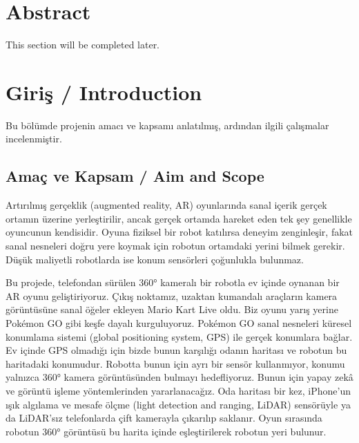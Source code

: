 \documentclass[11pt,a4paper]{article}
\begin{document}
\vspace{1cm}

\section*{Abstract}
This section will be completed later.

\newpage
\tableofcontents
\newpage
\listoffigures
\listoftables
\newpage

\setcounter{page}{1}

\section{Giriş / Introduction}
\label{sec:giris}
Bu bölümde projenin amacı ve kapsamı anlatılmış, ardından ilgili çalışmalar incelenmiştir.

\subsection{Amaç ve Kapsam / Aim and Scope}
\label{subsec:amac_kapsam}
Artırılmış gerçeklik (augmented reality, AR) oyunlarında sanal içerik gerçek ortamın üzerine yerleştirilir, ancak gerçek ortamda hareket eden tek şey genellikle oyuncunun kendisidir. Oyuna fiziksel bir robot katılırsa deneyim zenginleşir, fakat sanal nesneleri doğru yere koymak için robotun ortamdaki yerini bilmek gerekir. Düşük maliyetli robotlarda ise konum sensörleri çoğunlukla bulunmaz.

Bu projede, telefondan sürülen 360° kameralı bir robotla ev içinde oynanan bir AR oyunu geliştiriyoruz. Çıkış noktamız, uzaktan kumandalı araçların kamera görüntüsüne sanal öğeler ekleyen Mario Kart Live \cite{mariokartlive2020} oldu. Biz oyunu yarış yerine Pokémon GO \cite{paavilainen2017pokemon} gibi keşfe dayalı kurguluyoruz. Pokémon GO sanal nesneleri küresel konumlama sistemi (global positioning system, GPS) ile gerçek konumlara bağlar. Ev içinde GPS olmadığı için bizde bunun karşılığı odanın haritası ve robotun bu haritadaki konumudur. Robotta bunun için ayrı bir sensör kullanmıyor, konumu yalnızca 360° kamera görüntüsünden bulmayı hedefliyoruz. Bunun için yapay zekâ ve görüntü işleme yöntemlerinden yararlanacağız. Oda haritası bir kez, iPhone'un ışık algılama ve mesafe ölçme (light detection and ranging, LiDAR) sensörüyle ya da LiDAR'sız telefonlarda çift kamerayla çıkarılıp saklanır. Oyun sırasında robotun 360° görüntüsü bu harita içinde eşleştirilerek robotun yeri bulunur.
\end{document}
